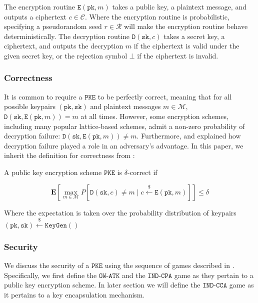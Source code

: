 \documentclass[floatrow,journal=tches,submission]{iacrtrans}
\newcommand{\monospace}{\texttt}
\newcommand{\pke}{\monospace{PKE}}
\newcommand{\keygen}{\monospace{KeyGen}}
\newcommand{\encrypt}{\monospace{E}}
\newcommand{\decrypt}{\monospace{D}}
\newcommand{\pk}{\monospace{pk}}
\newcommand{\sk}{\monospace{sk}}
\newcommand{\leftsample}{\stackrel{\$}{\leftarrow}}
\begin{document}
The encryption routine $\encrypt(\pk, m)$ takes a public key, a plaintext message, and outputs a ciphertext $c \in \mathcal{C}$. Where the encryption routine is probabilistic, specifying a pseudorandom seed $r \in \mathcal{R}$ will make the encryption routine behave deterministically. The decryption routine $\decrypt(\sk, c)$ takes a secret key, a ciphertext, and outputs the decryption $\hat{m}$ if the ciphertext is valid under the given secret key, or the rejection symbol $\bot$ if the ciphertext is invalid.

\subsubsection{Correctness}
It is common to require a $\pke$ to be perfectly correct, meaning that for all possible keypairs $(\pk, \sk)$ and plaintext messages $m \in \mathcal{M}$, $\decrypt(\sk, \encrypt(\pk, m)) = m$ at all times. However, some encryption schemes, including many popular lattice-based schemes, admit a non-zero probability of decryption failure: $\decrypt(\sk, \encrypt(\pk, m)) \neq m$. Furthermore, \cite{hofheinz2017modular} and \cite{avanzi2019crystals} explained how decryption failure played a role in an adversary's advantage. In this paper, we inherit the definition for correctness from \cite{hofheinz2017modular}:

\begin{definition}\label{def:delta-correctness}
    A public key encryption scheme $\pke$ is $\delta$-correct if

    \begin{equation*}
        \mathbf{E}[
            \max_{m \in \mathcal{M}} P[\decrypt(\sk, c) \neq m \mid c \leftsample \encrypt(\pk, m)]
        ] \leq \delta
    \end{equation*}

    Where the expectation is taken over the probability distribution of keypairs $(\pk, \sk) \leftsample \keygen()$
\end{definition}

\subsubsection{Security}
We discuss the security of a $\pke$ using the sequence of games described in \cite{shoup2004sequences}. Specifically, we first define the $\monospace{OW-ATK}$ and the $\monospace{IND-CPA}$ game as they pertain to a public key encryption scheme. In later section we will define the $\monospace{IND-CCA}$ game as it pertains to a key encapsulation mechanism.
\end{document}
